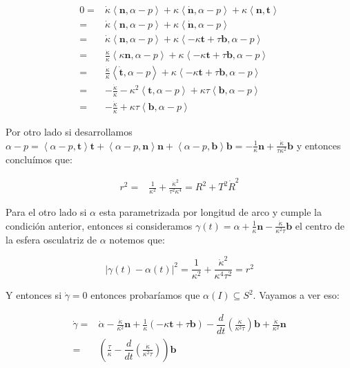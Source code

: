 \documentclass[11pt]{article}
\newcommand\abs[1]{\left\lvert#1\right\rvert}
\newcommand\ip[1]{\left\langle#1\right\rangle}
\renewcommand\tt{\mathbf{t}}
\newcommand\nn{\mathbf{n}}
\newcommand\bb{\mathbf{b}}                      %
\newenvironment{proof}[1][Demostraci\'on]{\begin{trivlist}
		\item[\hskip \labelsep {\bfseries #1}]}{\end{trivlist}}
\begin{document}
\begin{enumerate}
\begin{proof}
		\[
		\begin{aligned}
		0  = & \dot{\kappa} \ip{\nn ,\alpha-p } + \kappa \ip{\dot{\nn} , \alpha -p } + \kappa \ip{\nn , \tt} \\
		   = & \dot{\kappa} \ip{\nn ,\alpha-p } + \kappa \ip{\dot{\nn} , \alpha -p } \\
		   = & \dot{\kappa} \ip{\nn ,\alpha-p } + \kappa \ip{-\kappa \tt + \tau \bb, \alpha -p } \\
		   = & \frac{\dot{\kappa}}{\kappa} \ip{\kappa\nn ,\alpha-p } + \kappa \ip{-\kappa \tt + \tau \bb, \alpha -p } \\
		   = & \frac{\dot{\kappa}}{\kappa} \ip{\dot{\tt},\alpha-p } + \kappa \ip{-\kappa \tt + \tau \bb, \alpha -p } \\
		   = & -\frac{\dot{\kappa}}{\kappa} -\kappa^2 \ip{\tt , \alpha -p} + \kappa \tau \ip{\bb , \alpha -p} \\
		   = & -\frac{\dot{\kappa}}{\kappa} + \kappa \tau \ip{\bb , \alpha -p} 
		\end{aligned}
		\]
		
		Por otro lado si desarrollamos $\alpha - p = \ip{\alpha - p , \tt}\tt + \ip{\alpha - p , \nn} \nn + \ip{\alpha - p , \bb} \bb = -\frac{1}{\kappa} \nn + \frac{\dot{\kappa}}{\tau\kappa^2}\bb$ y entonces conclu\'imos que:
		
		\[
		\begin{aligned}
		r^2  = & \frac{1}{\kappa^2}  + \frac{\dot{\kappa}^2}{\tau^2\kappa^4} = R^2 + T^2\dot{R}^2
		\end{aligned}
		\]
		
		Para el otro lado si $\alpha$ esta parametrizada por longitud de arco y cumple la condici\'on anterior, entonces si consideramos $\gamma(t) = \alpha + \frac{1}{\kappa}\nn - \frac{\dot{\kappa}}{\kappa^2 \tau} \bb$ el centro de la esfera osculatriz de $\alpha$ notemos que:
		
		\[
		\abs{\gamma(t) - \alpha(t)}^2 = \frac{1}{\kappa^2} + \frac{\dot{\kappa}^2}{\kappa^4 \tau^2} = r^2 
		\]
		
		Y entonces si $\dot{\gamma} = 0$ entonces probar\'iamos que $\alpha(I) \subseteq S^2$. Vayamos a ver eso:
		
		\[
		\begin{aligned}
		\dot{\gamma}  = &  \dot{\alpha} - \frac{\dot{\kappa}}{\kappa^2}\nn + \frac{1}{\kappa}(-\kappa \tt + \tau \bb) - \dfrac{d}{dt} \left(\frac{\dot{\kappa}}{\kappa^2 \tau}\right) \bb + \frac{\dot{\kappa}}{\kappa^2 } \nn \\
					  = &  \left(  \frac{\tau}{\kappa} - \dfrac{d}{dt} \left(\frac{\dot{\kappa}}{\kappa^2 \tau}\right) \right) \bb \\
		\end{aligned}
		\]
		

\end{proof}
\end{enumerate}
\end{document}
